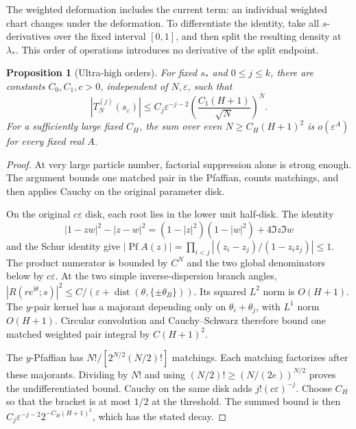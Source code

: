 \documentclass[11pt]{article}
\numberwithin{equation}{section}
\newtheorem{proposition}[theorem]{Proposition}
\theoremstyle{definition}
\newcommand{\ii}{\mathrm i}
\newcommand{\eps}{\varepsilon}
\newcommand{\Pf}{\operatorname{Pf}}
\newcommand{\dist}{\operatorname{dist}}
\newcommand{\sstar}{s_*}
\newcommand{\se}{s_\varepsilon}
\begin{document}
The weighted deformation includes the current term: an individual
weighted chart changes under the deformation. To differentiate the
identity, take all \(s\)-derivatives over the fixed interval
\([0,1]\), and then split the resulting density at \(\lambda_*\).
This order of operations introduces no derivative of the split endpoint.

\begin{proposition}[Ultra-high orders]\label{prop:ultrahigh}
For fixed \(\sstar\) and \(0\le j\le k\), there are constants
\(C_0,C_1,c>0\), independent of \(N,\eps\), such that
\[
 |T_N^{(j)}(\se)|
 \le C_j\eps^{-j-2}\left(\frac{C_1(H+1)}{\sqrt N}\right)^N.
\]
For a sufficiently large fixed \(C_H\),
the sum over even \(N\ge C_H(H+1)^2\) is \(o(\eps^A)\)
for every fixed real \(A\).
\end{proposition}
\begin{proof}
At very large particle number, factorial suppression alone is strong enough. The argument bounds one matched pair in the Pfaffian, counts matchings, and then applies Cauchy on the original parameter disk.

On the original \(c\eps\) disk, each root lies in the lower unit
half-disk. The identity
\[
 |1-zw|^2-|z-w|^2=(1-|z|^2)(1-|w|^2)+4\Im z\Im w
\]
and the Schur identity give
\(|\Pf A(z)|=\prod_{i<j}|(z_i-z_j)/(1-z_iz_j)|\le1\).
The product numerator is bounded by \(C^N\) and the two global
denominators below by \(c\eps\).
At the two simple inverse-dispersion branch angles,
\(|R(re^{\ii\theta};s)|^2\le C/(\eps+\dist(\theta,\{\pm\theta_B\}))\).
Its squared \(L^2\) norm is \(O(H+1)\). The \(y\)-pair kernel has a
majorant depending only on \(\theta_i+\theta_j\), with \(L^1\) norm
\(O(H+1)\). Circular convolution and Cauchy--Schwarz therefore bound
one matched weighted pair integral by \(C(H+1)^2\).

The \(y\)-Pfaffian has \(N!/[2^{N/2}(N/2)!]\) matchings.
Each matching factorizes after these majorants. Dividing by \(N!\)
and using \((N/2)!\ge(N/(2e))^{N/2}\) proves the undifferentiated
bound. Cauchy on the same disk adds \(j!(c\eps)^{-j}\).
Choose \(C_H\) so that the bracket is at most \(1/2\) at the threshold.
The summed bound is then
\(C_j\eps^{-j-2}2^{-C_H(H+1)^2}\), which has the stated decay.
\end{proof}
\end{document}
